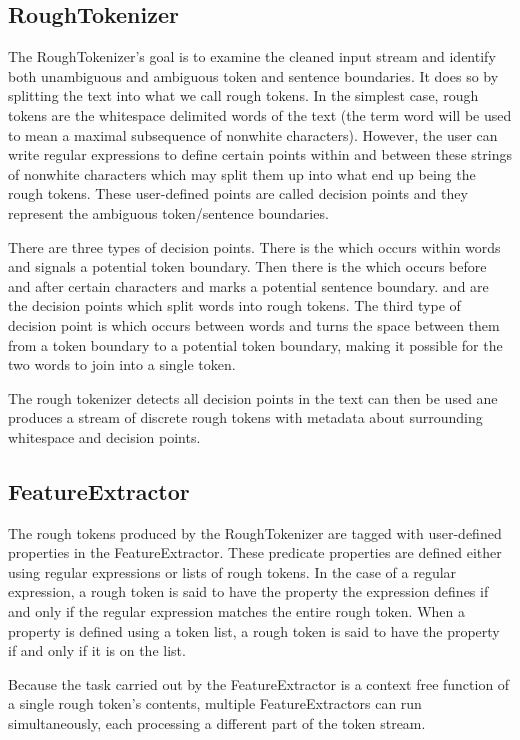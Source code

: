 \subsection{RoughTokenizer}

The RoughTokenizer's goal is to examine the cleaned input stream and identify
both unambiguous and ambiguous token and sentence boundaries. It does so by
splitting the text into what we call rough tokens. In the simplest case, rough
tokens are the whitespace delimited words of the text (the term word will be
used to mean a maximal subsequence of nonwhite characters). However, the user
can write regular expressions to define certain points within and between these
strings of nonwhite characters which may split them up into what end up being
the rough tokens. These user-defined points are called decision points and they
represent the ambiguous token/sentence boundaries.

There are three types of decision points. There is the \maysplit{} which occurs
within words and signals a potential token boundary. Then there is the
\maybreaksentence{} which occurs before and after certain characters and marks
a potential sentence boundary. \maysplit{} and \maybreaksentence{} are the
decision points which split words into rough tokens. The third type of decision
point is \mayjoin{} which occurs between words and turns the space between them
from a token boundary to a potential token boundary, making it possible for the
two words to join into a single token.

The rough tokenizer detects all decision points in the text can then be used
ane produces a stream of discrete rough tokens with metadata about surrounding
whitespace and decision points.

\subsection{FeatureExtractor}

The rough tokens produced by the RoughTokenizer are tagged with user-defined
properties in the FeatureExtractor. These predicate properties are defined
either using regular expressions or lists of rough tokens. In the case of a
regular expression, a rough token is said to have the property the expression
defines if and only if the regular expression matches the entire rough token.
When a property is defined using a token list, a rough token is said to have
the property if and only if it is on the list.

Because the task carried out by the FeatureExtractor is a context free function
of a single rough token's contents, multiple FeatureExtractors can run
simultaneously, each processing a different part of the token stream.

